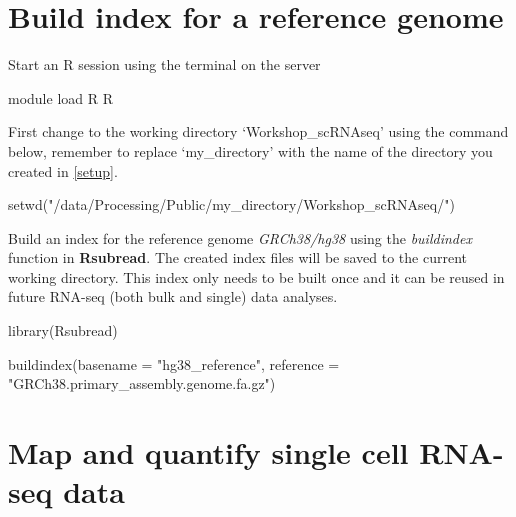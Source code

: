 \documentclass[
  openany]{book}
\newenvironment{Shaded}{\begin{snugshade}}{\end{snugshade}}
\newcommand{\AttributeTok}[1]{\textcolor[rgb]{0.77,0.63,0.00}{#1}}
\newcommand{\ExtensionTok}[1]{#1}
\newcommand{\FunctionTok}[1]{\textcolor[rgb]{0.00,0.00,0.00}{#1}}
\newcommand{\NormalTok}[1]{#1}
\newcommand{\StringTok}[1]{\textcolor[rgb]{0.31,0.60,0.02}{#1}}
\begin{document}
\hypertarget{build-index-for-a-reference-genome}{%
\section{Build index for a reference genome}\label{build-index-for-a-reference-genome}}

Start an R session using the terminal on the server

\begin{Shaded}
\begin{Highlighting}[]
\ExtensionTok{module}\NormalTok{ load R}
\ExtensionTok{R}
\end{Highlighting}
\end{Shaded}

First change to the working directory `Workshop\_scRNAseq' using the command below, remember to replace `my\_directory' with the name of the directory you created in \ref{setup}.

\begin{Shaded}
\begin{Highlighting}[]
\FunctionTok{setwd}\NormalTok{(}\StringTok{"/data/Processing/Public/my\_directory/Workshop\_scRNAseq/"}\NormalTok{)}
\end{Highlighting}
\end{Shaded}

Build an index for the reference genome \emph{GRCh38/hg38} using the \emph{buildindex} function in \textbf{Rsubread}. The created index files will be saved to the current working directory. This index only needs to be built once and it can be reused in future RNA-seq (both bulk and single) data analyses.

\begin{Shaded}
\begin{Highlighting}[]
\FunctionTok{library}\NormalTok{(Rsubread)}
\end{Highlighting}
\end{Shaded}

\begin{Shaded}
\begin{Highlighting}[]
\FunctionTok{buildindex}\NormalTok{(}\AttributeTok{basename =} \StringTok{"hg38\_reference"}\NormalTok{, }
           \AttributeTok{reference =} \StringTok{"GRCh38.primary\_assembly.genome.fa.gz"}\NormalTok{)}
\end{Highlighting}
\end{Shaded}

\hypertarget{counts}{%
\section{Map and quantify single cell RNA-seq data}\label{counts}}
\end{document}
